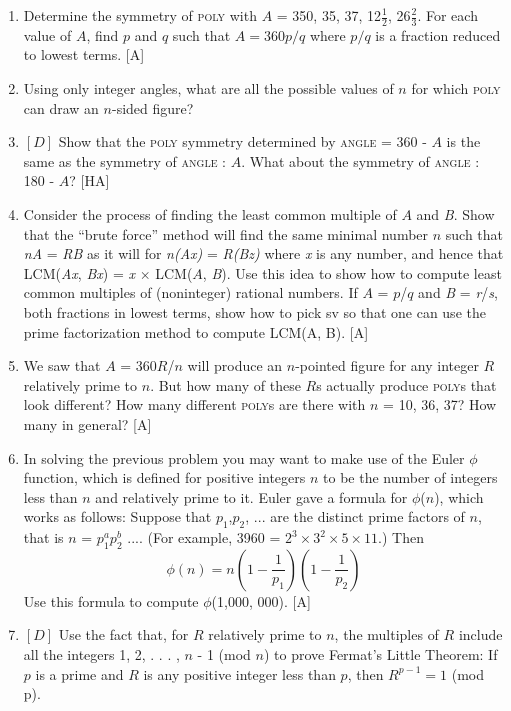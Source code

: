 \documentclass{book}
\begin{document}
\begin{enumerate}
\item Determine the symmetry of \textsc{poly} with $A$ = 350, 35, 37, 12$\frac{1}{2}$, 26$\frac{2}{3}$. For
each value of $A$, find $p$ and $q$ such that $A = 360p/q$ where $p/q$ is a
fraction reduced to lowest terms. [A]
\item Using only integer angles, what are all the possible values of $n$ for
which \textsc{poly} can draw an $n$-sided figure?  
\item $[D]$ Show that the \textsc{poly} symmetry determined by \textsc{angle} = 360 - $A$
is the same as the symmetry of \textsc{angle} : $A$. What about the symmetry
of \textsc{angle} : 180 - $A$? [HA]
\item Consider the process of finding the least common multiple of $A$ and
{\em B}. Show that the ``brute force'' method will find the same minimal
number $n$ such that {\em nA} = {\em RB} as it will for {\em n(Ax)} = {\em R(Bz)} where {\em x} is
any number, and hence that LCM({\em Ax}, {\em Bx}) = {\em x} $\times$ LCM($A$, {\em B}). Use this
idea to show how to compute least common multiples of (noninteger)
rational numbers. If $A$ = $p$/$q$ and {\em B} = {\em r}/{\em s}, both fractions in lowest
terms, show how to pick sv so that one can use the prime factorization
method to compute LCM(A, B). [A]
\item We saw that $A$ = 360$R$/$n$ will produce an $n$-pointed figure for any
integer $R$ relatively prime to $n$. But how many of these $R$s actually
produce \textsc{poly}s that look different? How many different \textsc{poly}s are there
with $n$ = 10, 36, 37? How many in general? [A]
\item In solving the previous problem you may want to make use of the
Euler $\phi$ function, which is defined for positive integers $n$ to be the number
of integers less than $n$ and relatively prime to it. Euler gave a formula
for $\phi$($n$), which works as follows: Suppose that {\em $p_1$},{\em $p_2$}, $...$ are the distinct
prime factors of $n$, that is $n$ = $p_1^ap_2^b$ .... (For example, 3960 = $2^3 \times
3^2 \times 5 \times 11$.) Then
$$\phi(n) = n(1 - \frac{1}{p_1})(1 - \frac{1}{p_2})$$
\noindent Use this formula to compute $\phi$(1,000, 000). [A]
\item $[D]$ Use the fact that, for $R$ relatively prime to $n$, the multiples of $R$
include all the integers 1, 2, . . . , $n$ - 1 (mod $n$) to prove Fermat's Little
Theorem: If $p$ is a prime and $R$ is any positive integer less than $p$, then
$R^{p-1} = 1$ (mod p).  

\end{enumerate}
\end{document}
